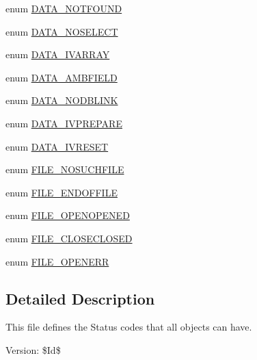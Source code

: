 \begin{Indent}{\bf }\par
\begin{CompactItemize}
\item 
enum \hyperlink{owl_8statuscodes_8php_1b3920489f064605aec419c2f18a43c6}{DATA\_\-NOTFOUND} 
\item 
enum \hyperlink{owl_8statuscodes_8php_d2b2ac63774859fb01412dcf1d416a30}{DATA\_\-NOSELECT} 
\item 
enum \hyperlink{owl_8statuscodes_8php_de36d7efad634ceb46de1b6670e6af08}{DATA\_\-IVARRAY} 
\item 
enum \hyperlink{owl_8statuscodes_8php_4567c5a928f00431e3c61ed317494ad1}{DATA\_\-AMBFIELD} 
\item 
enum \hyperlink{owl_8statuscodes_8php_f5b9acbc941403d2077e28968a8ad3fc}{DATA\_\-NODBLINK} 
\item 
enum \hyperlink{owl_8statuscodes_8php_ef494323f427edd5668413ba3ae3e4c0}{DATA\_\-IVPREPARE} 
\item 
enum \hyperlink{owl_8statuscodes_8php_86d2cc4775b7b6282502b36048984a24}{DATA\_\-IVRESET} 
\end{CompactItemize}
\end{Indent}
\begin{Indent}{\bf }\par
\begin{CompactItemize}
\item 
enum \hyperlink{owl_8statuscodes_8php_a5abc6e073dcb61147f56d7854983787}{FILE\_\-NOSUCHFILE} 
\item 
enum \hyperlink{owl_8statuscodes_8php_c0e1f657ef7713fe45084b10af74670b}{FILE\_\-ENDOFFILE} 
\item 
enum \hyperlink{owl_8statuscodes_8php_3abc0dabe8ead6f76dd62c3e2b506af7}{FILE\_\-OPENOPENED} 
\item 
enum \hyperlink{owl_8statuscodes_8php_ce4541108274f542d69d8fa4523e13f6}{FILE\_\-CLOSECLOSED} 
\item 
enum \hyperlink{owl_8statuscodes_8php_d540d25f34464adfbce1258d9a37fe3f}{FILE\_\-OPENERR} 
\end{CompactItemize}
\end{Indent}


\subsection{Detailed Description}
This file defines the Status codes that all objects can have. \begin{Desc}
\item[Version:]\$Id\$ \end{Desc}


